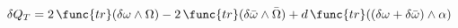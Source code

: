 \begin{equation}
\delta Q_{T}=2\,\func{tr}(\delta \omega \wedge \Omega
)-2\,\func{tr}(\delta \bar{\omega}\wedge \bar{\Omega
})+d\,\func{tr}((\delta \omega +\delta \bar{\omega})\wedge \alpha
)\ \label{eqn:dQT}
\end{equation}

